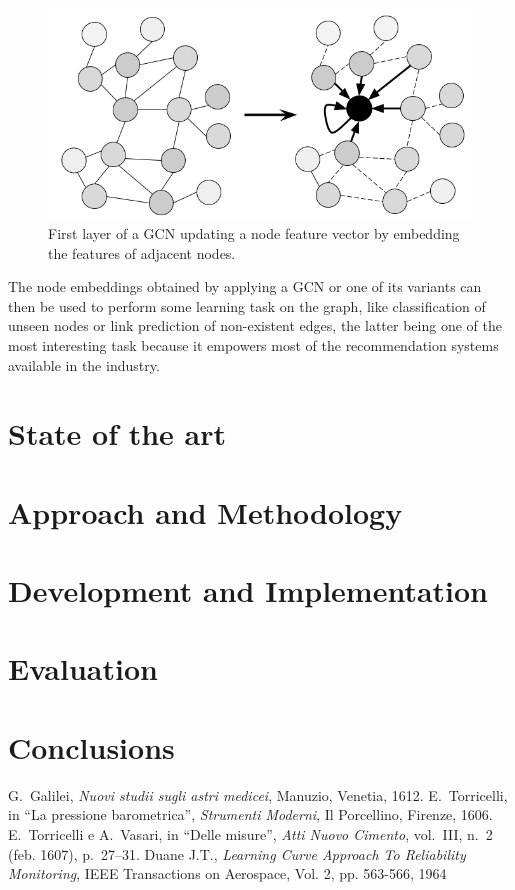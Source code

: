 \documentclass[%
    corpo=13.5pt,
    twoside,
    oldstyle,
    tipotesi=magistrale,
    greek,
    evenboxes
]{toptesi}
\begin{document}
\begin{figure}[h]
    \centering
    \includegraphics[scale=0.4]{img/gcn.png}
    \caption{First layer of a GCN updating a node feature vector by embedding
        the features of adjacent nodes.}
    \label{fig:gcn}
    \end{figure}

The node embeddings obtained by applying a GCN or one of its variants can
then be used to perform some learning task on the graph, like classification
of unseen nodes or link prediction of non-existent edges, the latter being
one of the most interesting task because it empowers most of the
recommendation systems available in the industry.



\chapter{State of the art}

\chapter{Approach and Methodology}

\chapter{Development and Implementation}

\chapter{Evaluation}

\chapter{Conclusions}


\begin{thebibliography}{9}
 G.~Galilei, {\em Nuovi studii sugli astri medicei}, Manuzio,
        Venetia, 1612.
 E.~Torricelli, in ``La pressione barometrica'', {\em Strumenti
        Moderni}, Il Porcellino, Firenze, 1606.
 E.~Torricelli e A.~Vasari, in ``Delle misure'', {\em Atti Nuovo
        Cimento}, vol.~III, n.~2 (feb. 1607), p.~27--31.
 Duane J.T., \emph{Learning Curve Approach To Reliability
		Monitoring}, IEEE Transactions on Aerospace, Vol. 2, pp. 563-566, 1964
\end{thebibliography}
\end{document}
